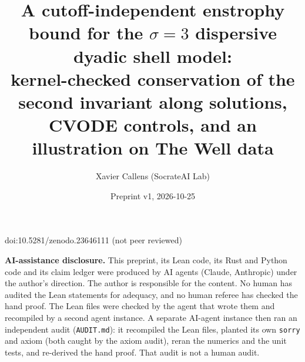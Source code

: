 \documentclass[11pt]{article}
\title{A cutoff-independent enstrophy bound for the $\sigma=3$ dispersive dyadic shell model:\\
kernel-checked conservation of the second invariant along solutions,\\ CVODE controls, and an illustration on The Well data}
\author{Xavier Callens (SocrateAI Lab)}
\date{Preprint v1, 2026-10-25}
\theoremstyle{remark}
\newcommand{\lean}[1]{\texttt{#1}}
\begin{document}
\maketitle
\begin{center}\small doi:10.5281/zenodo.23646111 \quad (not peer reviewed)\end{center}


\noindent\textbf{AI-assistance disclosure.} This preprint, its Lean code, its Rust and Python code and its claim ledger
were produced by AI agents (Claude, Anthropic) under the author's direction. The author is responsible for the content.
No human has audited the Lean statements for adequacy, and no human referee has checked the hand proof. The Lean files
were checked by the agent that wrote them and recompiled by a second agent instance. A separate AI-agent instance then ran an
independent audit (\texttt{AUDIT.md}): it recompiled the Lean files, planted its own \lean{sorry} and axiom (both caught by the
axiom audit), reran the numerics and the unit tests, and re-derived the hand proof. That audit is not a human audit.
\end{document}
